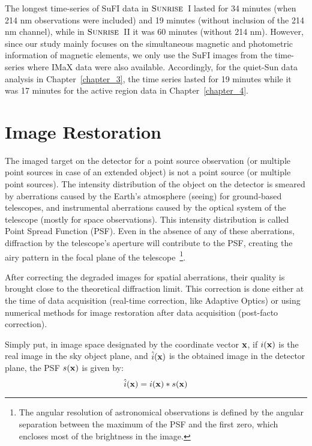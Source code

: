 \documentclass[goettingen, gauss, print]{thesis}
\begin{document}
The longest time-series of SuFI data in $\textsc{Sunrise}$~I lasted for 34 minutes (when 214 nm observations were included) and 19 minutes (without inclusion of the 214 nm channel), while in $\textsc{Sunrise}$~II it was 60 minutes (without 214 nm). However, since our study mainly focuses on the simultaneous magnetic and photometric information of magnetic elements, we only use the SuFI images from the time-series where IMaX data were also available. Accordingly, for the quiet-Sun data analysis in Chapter~\ref{chapter_3}, the time series lasted for 19 minutes while it was 17 minutes for the active region data in Chapter~\ref{chapter_4}. 

\newpage
\section{Image Restoration}
\label{intro-restoration}
\iffalse

The imaged target on the detector for a point source observation (or multiple point sources in case of an extended object) is not a point source (or multiple point sources). The intensity distribution of the object on the detector is smeared by aberrations caused by the Earth's atmosphere (seeing) for ground-based telescopes, and instrumental aberrations caused by the optical system of the telescope (mostly for space observations). This intensity distribution is called Point Spread Function (PSF). Even in the absence of any of these aberrations, diffraction by the telescope's aperture will contribute to the PSF, creating the airy pattern in the focal plane of the telescope~\footnote{The angular resolution of astronomical observations is defined by the angular separation between the maximum of the PSF and the first zero, which encloses most of the brightness in the image. }.

After correcting the degraded images for spatial aberrations, their quality is brought close to the theoretical diffraction limit. This correction is done either at the time of data acquisition (real-time correction, like Adaptive Optics) or using numerical methods for image restoration after data acquisition (post-facto correction).  

Simply put, in image space designated by the coordinate vector $\bold{x}$, if $i(\bold{x})$ is the real image in the sky object plane, and $\hat{i}(\bold{x})$ is the obtained image in the detector plane, the PSF $s(\bold{x})$ is given by:
\begin{equation}
\hat{i}(\bold{x}) = i(\bold{x}) \ast s(\bold{x})
\end{equation}
\end{document}
